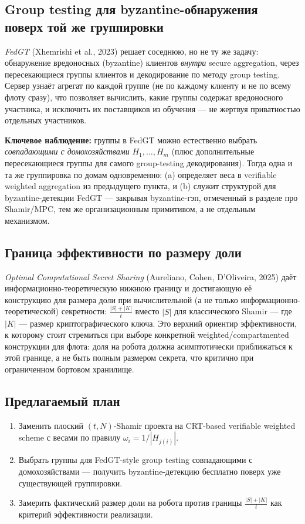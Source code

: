 \documentclass[11pt]{article}
\begin{document}
\subsection*{Group testing для byzantine-обнаружения поверх той же группировки}

\emph{FedGT} \cite{fedgt2023} (Xhemrishi et al., 2023) решает соседнюю, но не ту же
задачу: обнаружение вредоносных (byzantine) клиентов \emph{внутри} secure
aggregation, через пересекающиеся группы клиентов и декодирование по методу group
testing. Сервер узнаёт агрегат по каждой группе (не по каждому клиенту и не по
всему флоту сразу), что позволяет вычислить, какие группы содержат вредоносного
участника, и исключить их поставщиков из обучения — не жертвуя приватностью
отдельных участников.

\textbf{Ключевое наблюдение:} группы в FedGT можно естественно выбрать
\emph{совпадающими с домохозяйствами} $H_1,\dots,H_m$ (плюс дополнительные
пересекающиеся группы для самого group-testing декодирования). Тогда одна и та же
группировка по домам одновременно: (a) определяет веса в verifiable weighted
aggregation из предыдущего пункта, и (b) служит структурой для byzantine-детекции
FedGT — закрывая byzantine-гэп, отмеченный в разделе про Shamir/MPC, тем же
организационным примитивом, а не отдельным механизмом.

\subsection*{Граница эффективности по размеру доли}

\emph{Optimal Computational Secret Sharing} \cite{optcss2025} (Aureliano, Cohen,
D'Oliveira, 2025) даёт информационно-теоретическую нижнюю границу и достигающую её
конструкцию для размера доли при вычислительной (а не только
информационно-теоретической) секретности: $\frac{|S|+|K|}{t}$ вместо $|S|$ для
классического Shamir — где $|K|$ — размер криптографического ключа. Это верхний
ориентир эффективности, к которому стоит стремиться при выборе конкретной
weighted/compartmented конструкции для флота: доля на робота должна
асимптотически приближаться к этой границе, а не быть полным размером секрета,
что критично при ограниченном бортовом хранилище.

\subsection*{Предлагаемый план}

\begin{enumerate}
  \item Заменить плоский $(t,N)$-Shamir проекта на CRT-based verifiable weighted
        scheme \cite{vwss2025} с весами по правилу $\omega_i = 1/|H_{j(i)}|$.
  \item Выбрать группы для FedGT-style group testing \cite{fedgt2023} совпадающими
        с домохозяйствами — получить byzantine-детекцию \guillemotleft
        бесплатно\guillemotright{} поверх уже существующей группировки.
  \item Замерить фактический размер доли на робота против границы
        $\frac{|S|+|K|}{t}$ \cite{optcss2025} как критерий эффективности реализации.
\end{enumerate}
\end{document}
